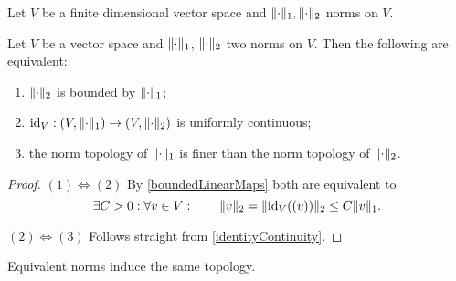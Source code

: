 \begin{lemma}
Let $V$ be a finite dimensional vector space and $\lVert\cdot\rVert_1, \lVert\cdot\rVert_2$ norms on $V$. 
\end{lemma}

\begin{proposition} \label{normComparison}
Let $V$ be a vector space and $\lVert\cdot\rVert_1$, $\lVert\cdot\rVert_2$ two norms on $V$. Then the following are equivalent:
\begin{enumerate}
\item $\lVert\cdot\rVert_2$ is bounded by $\lVert\cdot\rVert_1$;
\item $\id_V: \sSet{V,\norm{\cdot}_1} \to \sSet{V,\norm{\cdot}_2}$ is uniformly continuous;
\item the norm topology of $\lVert\cdot\rVert_1$ is finer than the norm topology of $\lVert\cdot\rVert_2$.
\end{enumerate}
\end{proposition}
\begin{proof}
$(1) \Leftrightarrow (2)$ By \ref{boundedLinearMaps} both are equivalent to
\[ \exists C>0: \forall v\in V: \qquad \lVert v\rVert_2 = \lVert\operatorname{id}_V((v))\rVert_2 \leq C\lVert v\rVert_1. \]

$(2) \Leftrightarrow (3)$ Follows straight from \ref{identityContinuity}.
\end{proof}
\begin{corollary}
Equivalent norms induce the same topology.
\end{corollary}

